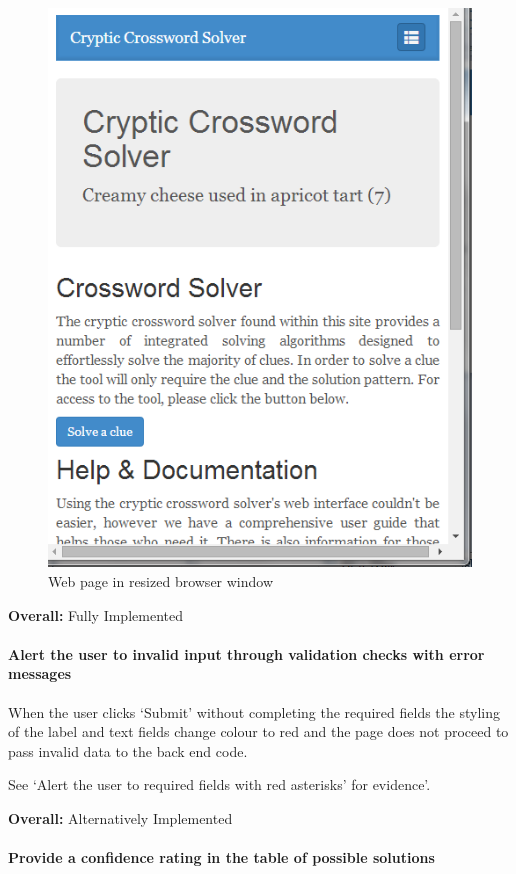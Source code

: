 \begin{figure}[H]
	\centering
	\includegraphics[keepaspectratio=true,scale=0.5]{evidence/scrolling1.png}
	\caption{Web page in resized browser window}
\end{figure}

{\bf Overall:} Fully Implemented

\paragraph{Alert the user to invalid input through validation checks
with error messages} 
     When the user clicks `Submit' without completing the required fields 
the styling of the label and text fields change colour to red and the page 
does not proceed to pass invalid data to the back end code. 

See `Alert the user to required fields with red asterisks' for evidence'.

{\bf Overall:} Alternatively Implemented 

\paragraph{Provide a confidence rating in the table of possible solutions}

